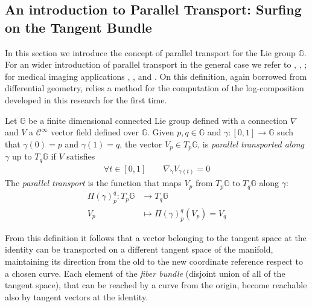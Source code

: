 \subsection{An introduction to Parallel Transport: Surfing on the Tangent Bundle}\label{se:parallel_transport}

In this section we introduce the concept of parallel transport for the Lie group $\mathbb{G}$. 
For an wider introduction of parallel transport in the general case we refer to \cite{misner1973gravitation}, \cite{knebelman1951spaces}, \cite{kheyfets2000schild}; for medical imaging applications \cite{lorenzi2011schild}, \cite{pennec2011parallel}, \cite{lorenzi2013geodesics} and \cite{lorenzi2014efficient}.
On this definition, again borrowed from differential geometry, relies a method for the computation of the log-composition developed in this research for the first time.
\begin{definition}
	Let $\mathbb{G}$ be a finite dimensional connected Lie group defined with a connection $\nabla$ and $V$ a $\mathcal{C}^{\infty}$ vector field defined over $\mathbb{G}$. Given $p,q \in \mathbb{G}$ and $\gamma : [0,1] \rightarrow \mathbb{G}$ such that $\gamma(0) = p$ and $\gamma(1) = q$, the vector $V_{p} \in T_{p}\mathbb{G}$, is \emph{parallel transported along $\gamma$} up to $T_{q}\mathbb{G}$ if $V$ satisfies
	\begin{align*}
	\forall t \in  [0,1]
	\qquad
	\nabla_{\dot{\gamma}}V_{\gamma(t)} = 0
	\end{align*}
	The \emph{parallel transport} is the function that maps $V_{p}$ from $T_{p}\mathbb{G}$ to $T_{q}\mathbb{G}$ along $\gamma$:
	\begin{align*}
	\Pi(\gamma)_{p}^{q} :  T_{p}\mathbb{G} & \longrightarrow T_{q}\mathbb{G}  \\
	V_{p}&\longmapsto \Pi(\gamma)_{p}^{q}(V_{p}) = V_{q}
	\end{align*}
\end{definition}

From this definition it follows that a vector belonging to the tangent space at the identity can be transported on a different tangent space of the manifold, maintaining its direction from the old to the new coordinate reference respect to a chosen curve. Each element of the \emph{fiber bundle} (disjoint union of all of the tangent space), that can be reached by a curve from the origin, become reachable also by tangent vectors at the identity.

